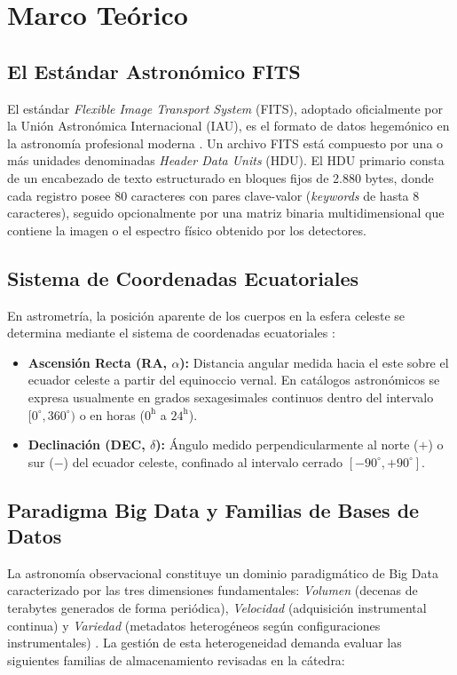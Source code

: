 \documentclass[10pt]{article}
\begin{document}
\section{Marco Teórico}\label{sec:marco_teorico}

\subsection{El Estándar Astronómico FITS}
El estándar \textit{Flexible Image Transport System} (FITS), adoptado oficialmente por la Unión Astronómica Internacional (IAU), es el formato de datos hegemónico en la astronomía profesional moderna \cite{pence2010fits}. Un archivo FITS está compuesto por una o más unidades denominadas \textit{Header Data Units} (HDU). El HDU primario consta de un encabezado de texto estructurado en bloques fijos de 2.880 bytes, donde cada registro posee 80 caracteres con pares clave-valor (\textit{keywords} de hasta 8 caracteres), seguido opcionalmente por una matriz binaria multidimensional que contiene la imagen o el espectro físico obtenido por los detectores.

\subsection{Sistema de Coordenadas Ecuatoriales}
En astrometría, la posición aparente de los cuerpos en la esfera celeste se determina mediante el sistema de coordenadas ecuatoriales \cite{karttunen2016fundamental}:
\begin{itemize}
    \item \textbf{Ascensión Recta (RA, $\alpha$):} Distancia angular medida hacia el este sobre el ecuador celeste a partir del equinoccio vernal. En catálogos astronómicos se expresa usualmente en grados sexagesimales continuos dentro del intervalo $[0^{\circ}, 360^{\circ})$ o en horas ($0^{\text{h}}$ a $24^{\text{h}}$).
    \item \textbf{Declinación (DEC, $\delta$):} Ángulo medido perpendicularmente al norte ($+$) o sur ($-$) del ecuador celeste, confinado al intervalo cerrado $[-90^{\circ}, +90^{\circ}]$.
\end{itemize}

\subsection{Paradigma Big Data y Familias de Bases de Datos}
La astronomía observacional constituye un dominio paradigmático de Big Data caracterizado por las tres dimensiones fundamentales: \textit{Volumen} (decenas de terabytes generados de forma periódica), \textit{Velocidad} (adquisición instrumental continua) y \textit{Variedad} (metadatos heterogéneos según configuraciones instrumentales) \cite{zhang2015bigdata}. La gestión de esta heterogeneidad demanda evaluar las siguientes familias de almacenamiento revisadas en la cátedra:
\end{document}
